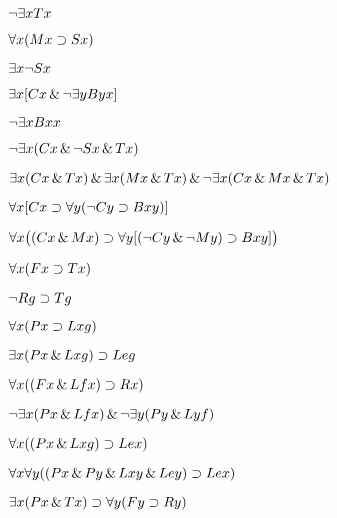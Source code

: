 \begin{earg}
\item %
$\neg\exists x Tx$
\item %
$\forall x(Mx \supset Sx)$
\item %
$\exists x \neg Sx$
\item %
$\exists x[Cx \,\&\, \neg\exists y Byx]$
\item %
$\neg \exists x Bxx$
\item %
$\neg \exists x(Cx \,\&\, \neg Sx \,\&\, Tx)$
\item %
$\exists x(Cx \,\&\, Tx) \,\&\, \exists x(Mx \,\&\, Tx) \,\&\, \neg \exists x(Cx \,\&\, Mx \,\&\, Tx)$
\item %
$\forall x[Cx \supset \forall y(\neg Cy \supset Bxy)]$
\item %
$\forall x\bigl((Cx \,\&\, Mx) \supset \forall y[(\neg Cy \,\&\, \neg My) \supset Bxy]\bigr)$
\end{earg}

\begin{earg}
\item %
$\forall x(Fx \supset Tx)$
\item %
$\neg Rg \supset Tg$
\item %
$\forall x (Px \supset Lxg)$
\item %
$\exists x (Px \,\&\, Lxg) \supset Leg$
\item %
$\forall x ((Fx \,\&\, Lfx) \supset Rx)$
\item %
$\neg \exists x (Px \,\&\, Lfx) \,\&\, \neg \exists y (Py \,\&\, Lyf)$
\item %
$\forall x ((Px \,\&\, Lxg) \supset Lex)$
\item %
$\forall x \forall y ((Px \,\&\, Py \,\&\, Lxy \,\&\, Ley) \supset Lex)$
\item %
$\exists x (Px \,\&\, Tx) \supset \forall y (Fy \supset Ry)$
\end{earg}

